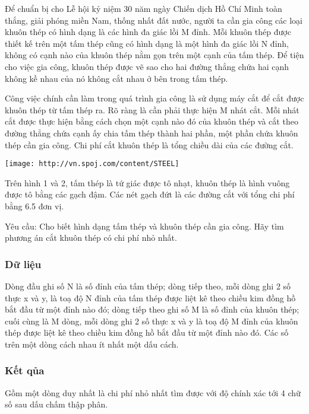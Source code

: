 



   Để chuẩn bị cho Lễ hội kỷ niệm 30 năm ngày Chiến dịch Hồ Chí Minh toàn thắng, giải phóng miền Nam, thống nhất đất nước, người ta cần gia   công các loại khuôn thép có hình dạng là các hình đa giác lồi M đỉnh. Mỗi khuôn thép được thiết kế trên một tấm thép cũng có hình dạng là một hình đa   giác lồi N đỉnh, không có cạnh nào của khuôn thép nằm gọn trên một cạnh của tấm thép.   Để tiện cho việc gia công, khuôn thép được vẽ sao cho hai   đường thẳng chứa hai cạnh không kề nhau của nó không cắt nhau ở bên trong tấm thép.

   Công việc chính cần làm trong quá trình gia công là sử dụng máy cắt để cắt được khuôn thép từ tấm thép ra. Rõ ràng là cần phải thực hiện M nhát   cắt. Mỗi nhát cắt được thực hiện bằng cách chọn một cạnh nào đó của khuôn thép và cắt theo đường thẳng chứa cạnh ấy chia tấm thép thành hai phần,   một phần chứa khuôn thép cần gia công. Chi phí cắt khuôn thép là tổng chiều dài của các đường cắt.  


\texttt{[image: http://vn.spoj.com/content/STEEL]}

   Trên hình 1 và 2, tấm thép là tứ giác được tô nhạt, khuôn thép là hình vuông được tô bằng các gạch đậm. Các nét gạch đứt là các đường cắt với   tổng chi phí bằng 6.5 đơn vị.  

   Yêu cầu: Cho biết hình dạng tấm thép và khuôn thép cần gia công. Hãy tìm phương án cắt khuôn thép có chi phí nhỏ nhất.  

\subsubsection{   Dữ liệu  }

   Dòng đầu ghi số N là số đỉnh của tấm thép; dòng tiếp theo, mỗi dòng ghi 2 số thực x và y, là toạ độ N đỉnh của tấm thép được liệt kê theo chiều   kim đồng hồ bắt đầu từ một đỉnh nào đó; dòng tiếp theo ghi số M là số đỉnh của khuôn thép; cuối cùng là M dòng, mỗi dòng ghi 2 số thực x và y là toạ   độ M đỉnh của khuôn thép được liệt kê theo chiều kim đồng hồ bắt đầu từ một đỉnh nào đó. Các số trên một dòng cách nhau ít nhất một dấu cách.  

\subsubsection{   Kết qủa  }

   Gồm một dòng duy nhất là chi phí nhỏ nhất tìm được với độ chính xác tới 4 chữ số sau dấu chấm thập phân.  

